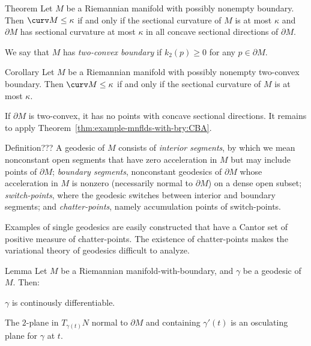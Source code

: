 \begin{thm}{Theorem}\label{thm:example-mnflds-with-bry:CBA}
Let $M$ be a Riemannian manifold with possibly nonempty boundary.
Then
$\curv M\le \kappa$
if and only if the sectional curvature of $M$ is at most $\kappa$
and $\partial M$ has sectional curvature at most $\kappa$ 
in all concave sectional directions of $\partial M$.
\end{thm}

We say that $M$ has \emph{two-convex boundary} 
if $k_2(p)\ge 0$ for any $p\in\partial M$.

%

\begin{thm}{Corollary}
Let $M$ be a Riemannian manifold with possibly nonempty two-convex boundary.
Then $\curv M\le{\kappa}$ 
if and only if the sectional curvature of $M$ is at most $\kappa$.
\end{thm}

If $\partial M$ is two-convex, 
it has no points with concave sectional directions.
It remains to apply Theorem~\ref{thm:example-mnflds-with-bry:CBA}.
\qeds

\begin{thm}{Definition}\label{def:mwb-segment}??? A geodesic of $M$ consists of  \emph{interior
segments}, by which we mean nonconstant open segments  that have zero acceleration in $M$ but
may include points of $\partial M$;  \emph{boundary segments}, nonconstant geodesics of $\partial M$ whose acceleration in $M$ is nonzero (necessarily normal to $\partial M$) on a dense open subset; \emph{switch-points}, where the geodesic switches between interior and boundary segments;  and \emph{chatter-points}, namely accumulation points of switch-points. 
\end{thm}

Examples of single geodesics are easily constructed that have a Cantor set of positive measure of chatter-points.
The existence of chatter-points makes the variational theory of geodesics
difficult to analyze.

\begin{thm}{Lemma}\label{lem:m-w-b-geodesic-'}
Let $M$ be a Riemannian manifold-with-boundary, and $\gamma$ be a geodesic of $M$. Then:
\begin{subthm}{}
$\gamma$ is continously differentiable.
\end{subthm}
\begin{subthm}{}
The $2$-plane in $T_{\gamma(t)}N$  normal to $\partial M$ and containing $\gamma'(t)$ is an osculating plane for $\gamma$ at $t$.
\end{subthm}
\end{thm}


